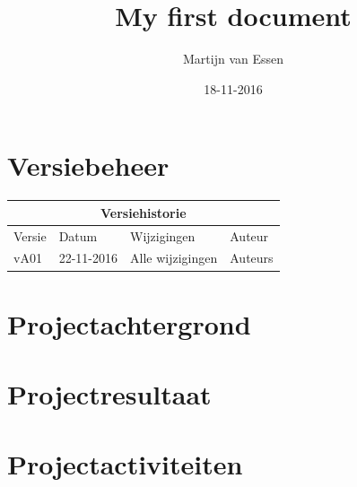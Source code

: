 \documentclass[numbers=endperiod]{scrartcl}
\title{My first document}
\date{18-11-2016}
\author{Martijn van Essen}
\begin{document}
	
	\newpage
	
	\setcounter{secnumdepth}{0} %
	\section{Versiebeheer}
	
	\begin{center}
		\begin{tabular}{| p{4cm} | l | p{7cm} | l |}
			\hline
			
			\multicolumn{4}{|c|}{
				\cellcolor{hhs_theme_heading_2}
				Versiehistorie
			}  \\ \hline
			
			Versie 	& Datum 		& Wijzigingen 	& Auteur \\ \hline
			vA01 	& 22-11-2016 	& Alle wijzigingen 
			&Auteurs\\ \hline
		\end{tabular}
	\end{center}
	\newpage
	
	\renewcommand{\contentsname}{Inhoudsopgave} %
	\tableofcontents
	\newpage
	
	\setcounter{secnumdepth}{3}%

	\section{Projectachtergrond}
	\newpage

	\section{Projectresultaat}
	\newpage

	\section{Projectactiviteiten}
	\newpage
\end{document}
